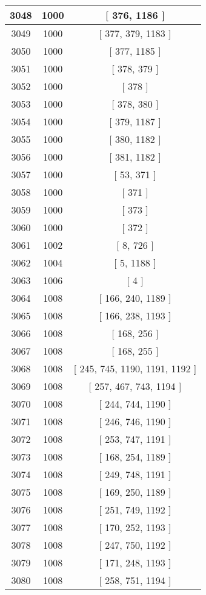 \begin{center}
\begin{longtable}[H]{|| c c c ||}
\hline
3048 & 1000 & [ 376, 1186 ] \\ 
\hline
3049 & 1000 & [ 377, 379, 1183 ] \\ 
\hline
3050 & 1000 & [ 377, 1185 ] \\ 
\hline
3051 & 1000 & [ 378, 379 ] \\ 
\hline
3052 & 1000 & [ 378 ] \\ 
\hline
3053 & 1000 & [ 378, 380 ] \\ 
\hline
3054 & 1000 & [ 379, 1187 ] \\ 
\hline
3055 & 1000 & [ 380, 1182 ] \\ 
\hline
3056 & 1000 & [ 381, 1182 ] \\ 
\hline
3057 & 1000 & [ 53, 371 ] \\ 
\hline
3058 & 1000 & [ 371 ] \\ 
\hline
3059 & 1000 & [ 373 ] \\ 
\hline
3060 & 1000 & [ 372 ] \\ 
\hline
3061 & 1002 & [ 8, 726 ] \\ 
\hline
3062 & 1004 & [ 5, 1188 ] \\ 
\hline
3063 & 1006 & [ 4 ] \\ 
\hline
3064 & 1008 & [ 166, 240, 1189 ] \\ 
\hline
3065 & 1008 & [ 166, 238, 1193 ] \\ 
\hline
3066 & 1008 & [ 168, 256 ] \\ 
\hline
3067 & 1008 & [ 168, 255 ] \\ 
\hline
3068 & 1008 & [ 245, 745, 1190, 1191, 1192 ] \\ 
\hline
3069 & 1008 & [ 257, 467, 743, 1194 ] \\ 
\hline
3070 & 1008 & [ 244, 744, 1190 ] \\ 
\hline
3071 & 1008 & [ 246, 746, 1190 ] \\ 
\hline
3072 & 1008 & [ 253, 747, 1191 ] \\ 
\hline
3073 & 1008 & [ 168, 254, 1189 ] \\ 
\hline
3074 & 1008 & [ 249, 748, 1191 ] \\ 
\hline
3075 & 1008 & [ 169, 250, 1189 ] \\ 
\hline
3076 & 1008 & [ 251, 749, 1192 ] \\ 
\hline
3077 & 1008 & [ 170, 252, 1193 ] \\ 
\hline
3078 & 1008 & [ 247, 750, 1192 ] \\ 
\hline
3079 & 1008 & [ 171, 248, 1193 ] \\ 
\hline
3080 & 1008 & [ 258, 751, 1194 ] \\ 

\end{longtable}
\end{center}
